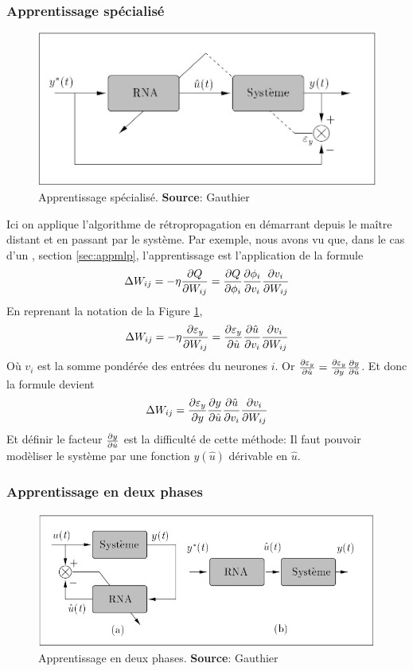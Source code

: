 \subsubsection{Apprentissage spécialisé}\label{sec:appspecial}
\begin{figure}
 \centering
 \includegraphics[scale=0.4]{../figures/appspecialise.jpg}
 \caption{Apprentissage spécialisé. \textbf{Source}: Gauthier\cite{Gauthier}}
 \label{appspecialise}
\end{figure}
Ici on applique l'algorithme de rétropropagation en démarrant depuis le maître distant et en passant par le système.
Par exemple, nous avons vu que, dans le cas d'un \mlp, section \ref{sec:appmlp}, l'apprentissage est l'application de la formule \[\Delta W_{ij} = -\eta\frac{\partial Q}{\partial W_{ij}} = \frac{\partial Q}{\partial \phi_i} \frac{\partial \phi_i}{\partial v_i} \frac{\partial v_i}{\partial W_{ij}}\]
En reprenant la notation de la Figure \ref{appspecialise}, \[\Delta W_{ij} = -\eta\frac{\partial \varepsilon_y}{\partial W_{ij}} = \frac{\partial \varepsilon_y}{\partial \hat{u}} \frac{\partial \hat{u}}{\partial v_i} \frac{\partial v_i}{\partial W_{ij}}\]
Où $v_i$ est la somme pondérée des entrées du neurones $i$.
Or $\frac{\partial \varepsilon_y}{\partial \hat{u}} = \frac{\partial \varepsilon_y}{\partial y}\frac{\partial y}{\partial \hat{u}}$. Et donc la formule devient
\[\Delta W_{ij} = \frac{\partial \varepsilon_y}{\partial y} \frac{\partial y}{\partial \hat{u}} \frac{\partial \hat{u}}{\partial v_i} \frac{\partial v_i}{\partial W_{ij}}\]
Et définir le facteur $\frac{\partial y}{\partial \hat{u}}$ est la difficulté de cette méthode:
Il faut pouvoir modèliser le système par une fonction $y(\hat{u})$ dérivable en $\hat{u}$.

\subsubsection{Apprentissage en deux phases}\label{sec:app2phases}
\begin{figure}
 \centering
 \includegraphics[scale=0.5]{../figures/app2phases.jpg}
 \caption{Apprentissage en deux phases. \textbf{Source}: Gauthier\cite{Gauthier}}
 \label{app2phases}
\end{figure}

